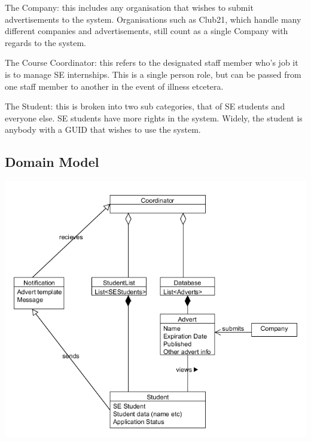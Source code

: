 \documentclass{l3deliverable}
\begin{document}
The Company: this includes any organisation that wishes to submit 
advertisements to the system. Organisations such as Club21, which handle
many different companies and advertisements, still count as a single Company
with regards to the system.

The Course Coordinator: this refers to the designated staff member who's job
it is to manage SE internships. This is a single person role, but can be 
passed from one staff member to another in the event of illness etcetera.

The Student: this is broken into two sub categories, that of SE students and
everyone else. SE students have more rights in the system. Widely, the student
is anybody with a GUID that wishes to use the system.


\subsection{Domain Model}


\includegraphics{DomainModel.png}

\end{document}

